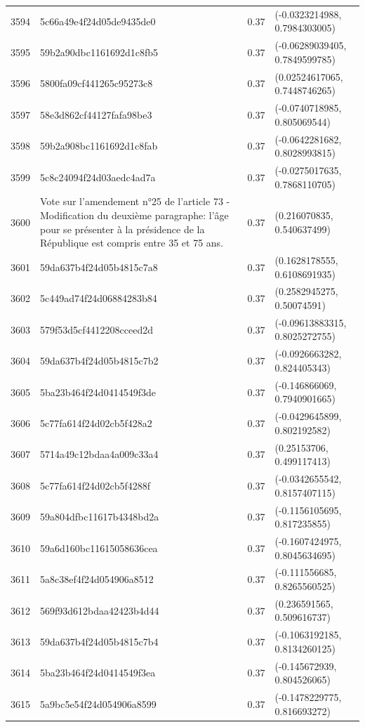 \begin{table}[ht]
\begin{tabular}{rlrl}
  3594 & 5c66a49e4f24d05de9435de0 & 0.37 & (-0.0323214988, 0.7984303005) \\ 
  3595 & 59b2a90dbc1161692d1c8fb5 & 0.37 & (-0.06289039405, 0.7849599785) \\ 
  3596 & 5800fa09cf441265c95273c8 & 0.37 & (0.02524617065, 0.7448746265) \\ 
  3597 & 58e3d862cf44127fafa98be3 & 0.37 & (-0.0740718985, 0.805069544) \\ 
  3598 & 59b2a908bc1161692d1c8fab & 0.37 & (-0.0642281682, 0.8028993815) \\ 
  3599 & 5c8c24094f24d03aedc4ad7a & 0.37 & (-0.0275017635, 0.7868110705) \\ 
  3600 & Vote sur l'amendement n°25 de l'article 73 - Modification du deuxième paragraphe: l'âge pour se présenter à la présidence de la République est compris entre 35 et 75 ans. & 0.37 & (0.216070835, 0.540637499) \\ 
  3601 & 59da637b4f24d05b4815c7a8 & 0.37 & (0.1628178555, 0.6108691935) \\ 
  3602 & 5c449ad74f24d06884283b84 & 0.37 & (0.2582945275, 0.50074591) \\ 
  3603 & 579f53d5cf4412208cceed2d & 0.37 & (-0.09613883315, 0.8025272755) \\ 
  3604 & 59da637b4f24d05b4815c7b2 & 0.37 & (-0.0926663282, 0.824405343) \\ 
  3605 & 5ba23b464f24d0414549f3de & 0.37 & (-0.146866069, 0.7940901665) \\ 
  3606 & 5c77fa614f24d02cb5f428a2 & 0.37 & (-0.0429645899, 0.802192582) \\ 
  3607 & 5714a49c12bdaa4a009c33a4 & 0.37 & (0.25153706, 0.499117413) \\ 
  3608 & 5c77fa614f24d02cb5f4288f & 0.37 & (-0.0342655542, 0.8157407115) \\ 
  3609 & 59a804dfbc11617b4348bd2a & 0.37 & (-0.1156105695, 0.817235855) \\ 
  3610 & 59a6d160bc11615058636cea & 0.37 & (-0.1607424975, 0.8045634695) \\ 
  3611 & 5a8c38ef4f24d054906a8512 & 0.37 & (-0.111556685, 0.8265560525) \\ 
  3612 & 569f93d612bdaa42423b4d44 & 0.37 & (0.236591565, 0.509616737) \\ 
  3613 & 59da637b4f24d05b4815c7b4 & 0.37 & (-0.1063192185, 0.8134260125) \\ 
  3614 & 5ba23b464f24d0414549f3ea & 0.37 & (-0.145672939, 0.804526065) \\ 
  3615 & 5a9bc5e54f24d054906a8599 & 0.37 & (-0.1478229775, 0.816693272) \\ 

\end{tabular}
\end{table}
